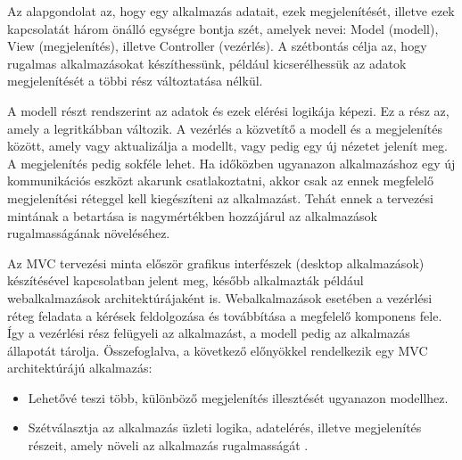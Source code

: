 Az alapgondolat az, hogy egy alkalmazás adatait, ezek megjelenítését, illetve ezek kapcsolatát három önálló egységre bontja szét, amelyek nevei: Model (modell), View (megjelenítés), illetve Controller (vezérlés). A szétbontás célja az, hogy rugalmas alkalmazásokat készíthessünk, például kicserélhessük az adatok megjelenítését a többi rész változtatása nélkül.

A modell részt rendszerint az adatok és ezek elérési logikája képezi. Ez a rész az, amely a legritkábban változik. A vezérlés a közvetítő a modell és a megjelenítés között, amely vagy aktualizálja a modellt, vagy pedig egy új nézetet jelenít meg. A megjelenítés pedig sokféle lehet. Ha időközben ugyanazon alkalmazáshoz egy új kommunikációs eszközt akarunk csatlakoztatni, akkor csak az ennek megfelelő megjelenítési réteggel kell kiegészíteni az alkalmazást. Tehát ennek a tervezési mintának a betartása is nagymértékben hozzájárul az alkalmazások rugalmasságának növeléséhez.


Az MVC tervezési minta először grafikus interfészek (desktop alkalmazások) készítésével kapcsolatban jelent meg, később alkalmazták például webalkalmazások architektúrájaként is. Webalkalmazások esetében a vezérlési réteg feladata a kérések feldolgozása és továbbítása a megfelelő komponens fele. Így a vezérlési rész felügyeli az alkalmazást, a modell pedig az alkalmazás állapotát tárolja. Összefoglalva, a következő előnyökkel rendelkezik egy MVC architektúrájú alkalmazás:
\begin{itemize}
	\item Lehetővé teszi több, különböző megjelenítés illesztését ugyanazon modellhez.
	\item Szétválasztja az alkalmazás üzleti logika, adatelérés, illetve megjelenítés részeit, amely növeli az alkalmazás rugalmasságát \cite{java-web-tech}.
\end{itemize}

